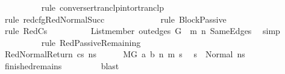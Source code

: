 \begin{isabellebody}
\ \ \ \ \ \ \ \ \isamarkupfalse%
\ {\isacharparenleft}{\kern0pt}rule\ converse{\isacharunderscore}{\kern0pt}rtranclp{\isacharunderscore}{\kern0pt}into{\isacharunderscore}{\kern0pt}rtranclp{\isacharparenright}{\kern0pt}\isanewline
\ \ \ \ \ \ \ \ \ \isamarkupfalse%
\ {\isacharparenleft}{\kern0pt}rule\ red{\isacharunderscore}{\kern0pt}cfg{\isachardot}{\kern0pt}RedNormalSucc{\isacharparenright}{\kern0pt}\isanewline
\ \ \ \ \ \ \ \ \ \ \ \isamarkupfalse%
\ {\isacharparenleft}{\kern0pt}rule\ BlockPassive{\isacharparenright}{\kern0pt}\isanewline
\ \ \ \ \ \ \ \ \ \ \isamarkupfalse%
\ {\isacharparenleft}{\kern0pt}rule\ RedCs{}{\isacharparenright}{\kern0pt}\isanewline
\ \ \ \ \ \ \ \ \isamarkupfalse%
\ {\isacartoucheopen}List{\isachardot}{\kern0pt}member\ {\isacharparenleft}{\kern0pt}out{\isacharunderscore}{\kern0pt}edges\ G{}\ {\isacharbang}{\kern0pt}\ m{\isacharparenright}{\kern0pt}\ n{\isacharprime}{\kern0pt}{\isacartoucheclose}\ SameEdges\ \isamarkupfalse%
\ simp\isanewline
\ \ \ \ \ \ \ \ \isamarkupfalse%
\ {\isacharparenleft}{\kern0pt}rule\ RedPassiveRemaining{\isacharparenright}{\kern0pt}\isanewline
\ \ \ \ \ \ \ \ \isamarkupfalse%
\isanewline
\ \ \ \ \isamarkupfalse%
\isanewline
\ \ \isamarkupfalse%
\isanewline
\ \ \ \ \isamarkupfalse%
\ {\isacharparenleft}{\kern0pt}RedNormalReturn\ cs\ ns{\isacharprime}{\kern0pt}{\isacharparenright}{\kern0pt}\isanewline
\ \ \ \ \isamarkupfalse%
\ {\isacartoucheopen}M{\isacharcomma}{\kern0pt}{\isasymLambda}{}{\isacharcomma}{\kern0pt}{\isasymGamma}{\isacharcomma}{\kern0pt}{\isasymOmega}{\isacharcomma}{\kern0pt}G{}\ {\isasymturnstile}{\isacharparenleft}{\kern0pt}a{\isacharcomma}{\kern0pt}\ b{\isacharparenright}{\kern0pt}\ {\isacharminus}{\kern0pt}n{\isasymrightarrow}{\isacharasterisk}{\kern0pt}\ {\isacharparenleft}{\kern0pt}m{\isacharprime}{\kern0pt}{\isacharcomma}{\kern0pt}\ s{\isacharprime}{\kern0pt}{\isacharparenright}{\kern0pt}{\isacartoucheclose}\ \isamarkupfalse%
\ {\isachardoublequoteopen}s{\isacharprime}{\kern0pt}\ {\isacharequal}{\kern0pt}\ Normal\ ns{\isacharprime}{\kern0pt}{\isachardoublequoteclose}\ \isamarkupfalse%
\ finished{\isacharunderscore}{\kern0pt}remains\ \isanewline
\ \ \ \ \ \ \isamarkupfalse%
\ blast\isanewline
\ \ \ \ \isamarkupfalse%

\end{isabellebody}
